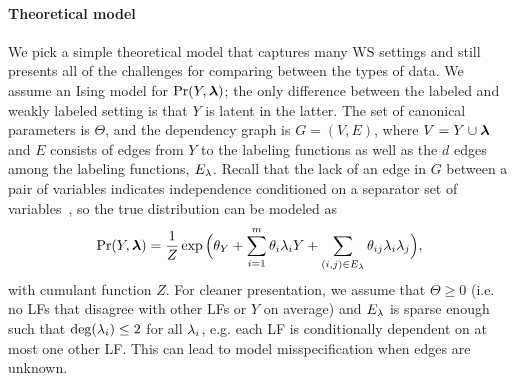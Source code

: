 \paragraph{Theoretical model}
We pick a simple theoretical model that captures many WS settings and still presents all of the challenges for comparing between the types of data. We assume an Ising model for $\Pr(Y, \bm{\lambda})$; the only difference between the labeled and weakly labeled setting is that $Y$ is latent in the latter. %
The set of canonical parameters is $\Theta$, and the dependency graph is $G = (V, E)$, where $V = Y \cup \bm{\lambda}$ and $E$ consists of edges from $Y$ to the labeling functions as well as the $d$ edges among the labeling functions, $E_{\lambda}$. %
Recall that the lack of an edge in $G$ between a pair of
variables indicates independence conditioned on a separator set of
variables~\citep{Lauritzen}, so the true distribution can be modeled as
\begin{align}
    \Pr(Y, \bm{\lambda}) = \frac{1}{Z} \exp \Big(\theta_Y + \sum_{i = 1}^m \theta_i \lambda_i Y + \sum_{(i, j) \in E_{\lambda}} \theta_{ij} \lambda_i \lambda_j \Big),
    \label{eq:true_pgm} \nonumber 
\end{align}
with cumulant function $Z$. For cleaner presentation, we assume that $\Theta \ge 0$ (i.e. no LFs that disagree with other LFs or $Y$ on average) and $E_{\lambda}$ is sparse enough such that $\text{deg}(\lambda_i) \le 2$ for all $\lambda_i$, e.g. each LF is conditionally dependent on at most one other LF. This can lead to model misspecification when edges are unknown.


